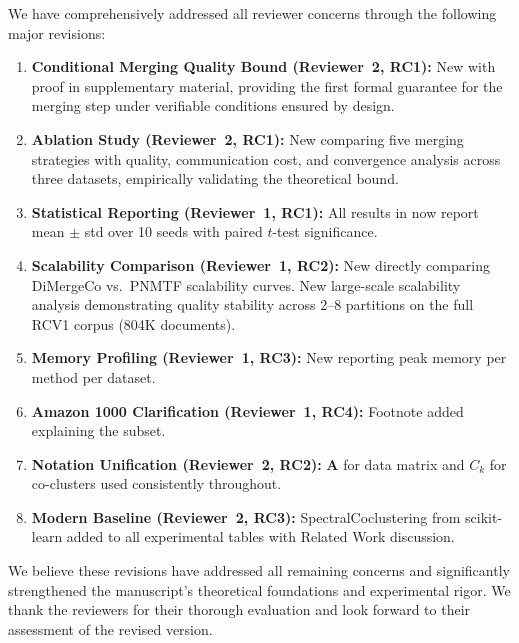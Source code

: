 \documentclass{ar2rc}
\theoremstyle{definition}
\theoremstyle{remark}
\begin{document}
We have comprehensively addressed all reviewer concerns through the following major revisions:

\begin{enumerate}
    \item \textbf{Conditional Merging Quality Bound (Reviewer~2, RC1):} New  with proof in supplementary material, providing the first formal guarantee for the merging step under verifiable conditions ensured by design.

    \item \textbf{Ablation Study (Reviewer~2, RC1):} New  comparing five merging strategies with quality, communication cost, and convergence analysis across three datasets, empirically validating the theoretical bound.

    \item \textbf{Statistical Reporting (Reviewer~1, RC1):} All results in  now report mean $\pm$ std over 10 seeds with paired $t$-test significance.

    \item \textbf{Scalability Comparison (Reviewer~1, RC2):} New  directly comparing DiMergeCo vs.\ PNMTF scalability curves. New large-scale scalability analysis demonstrating quality stability across 2--8 partitions on the full RCV1 corpus (804K documents).

    \item \textbf{Memory Profiling (Reviewer~1, RC3):} New  reporting peak memory per method per dataset.

    \item \textbf{Amazon 1000 Clarification (Reviewer~1, RC4):} Footnote added explaining the subset.

    \item \textbf{Notation Unification (Reviewer~2, RC2):} $\mathbf{A}$ for data matrix and $C_k$ for co-clusters used consistently throughout.

    \item \textbf{Modern Baseline (Reviewer~2, RC3):} SpectralCoclustering from scikit-learn added to all experimental tables with Related Work discussion.
\end{enumerate}

We believe these revisions have addressed all remaining concerns and significantly strengthened the manuscript's theoretical foundations and experimental rigor. We thank the reviewers for their thorough evaluation and look forward to their assessment of the revised version.

\printbibliography
\end{document}
